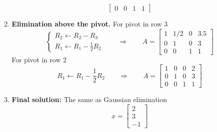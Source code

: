 \documentclass[../../../main.tex]{subfiles}
\begin{document}
\begin{enumerate}
\begin{equation*}
\begin{bmatrix}
                  0 & 0   & 1    & 1
              \end{bmatrix}
          \end{equation*}
    \item \textbf{Elimination above the pivot.}
          For pivot in row 3
          \begin{equation*}
              \begin{cases}
                  R_2\leftarrow R_2-R_3 \\
                  R_1\leftarrow R_1-\frac{1 }{2}R_2
              \end{cases}
              \qquad \Rightarrow \qquad
              A=
              \begin{bmatrix}
                  1 & 1/2 & 0 & 3.5 \\
                  0 & 1   & 0 & 3   \\
                  0 & 0   & 1 & 1
              \end{bmatrix}
          \end{equation*}
          For pivot in row 2
          \begin{equation*}
              R_1 \leftarrow R_1-\frac{1 }{2 }R_2
              \qquad \Rightarrow \qquad
              A=
              \begin{bmatrix}
                  1 & 0 & 0 & 2 \\
                  0 & 1 & 0 & 3 \\
                  0 & 0 & 1 & 1
              \end{bmatrix}
          \end{equation*}
    \item \textbf{Final solution:} The same as Gaussian elimination
          \begin{equation*}
              x =
              \begin{bmatrix}
                  2 \\ 3 \\ -1
              \end{bmatrix}
          \end{equation*}
\end{enumerate}
\end{document}
